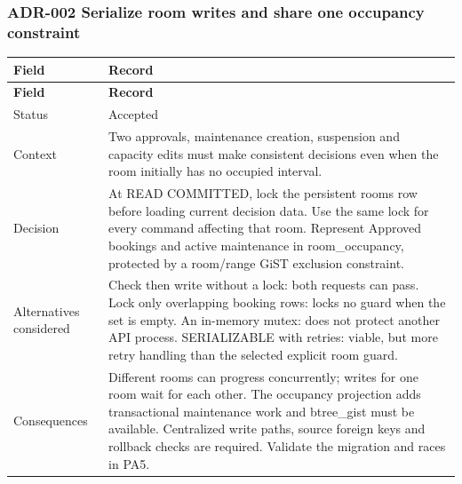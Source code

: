 \subsubsection{ADR-002 Serialize room writes and share one occupancy constraint}

\begin{longtable}{|p{}|p{}|}

\hline

\textbf{Field} & \textbf{Record} \\ \hline

\endfirsthead

\hline

\textbf{Field} & \textbf{Record} \\ \hline

\endhead

Status & Accepted \\ \hline

Context & Two approvals, maintenance creation, suspension and capacity edits must make consistent decisions even when the room initially has no occupied interval.\allowbreak{} \\ \hline

Decision & At READ COMMITTED, lock the persistent rooms row before loading current decision data.\allowbreak{} Use the same lock for every command affecting that room.\allowbreak{} Represent Approved bookings and active maintenance in room\_\allowbreak{}occupancy, protected by a room/\allowbreak{}range Gi\allowbreak{}ST exclusion constraint.\allowbreak{} \\ \hline

Alternatives considered & Check then write without a lock: both requests can pass.\allowbreak{} Lock only overlapping booking rows: locks no guard when the set is empty.\allowbreak{} An in-\allowbreak{}memory mutex: does not protect another API process.\allowbreak{} SERIALIZABLE with retries: viable, but more retry handling than the selected explicit room guard.\allowbreak{} \\ \hline

Consequences & Different rooms can progress concurrently; writes for one room wait for each other.\allowbreak{} The occupancy projection adds transactional maintenance work and btree\_\allowbreak{}gist must be available.\allowbreak{} Centralized write paths, source foreign keys and rollback checks are required.\allowbreak{} Validate the migration and races in PA5.\allowbreak{} \\ \hline

\end{longtable}

